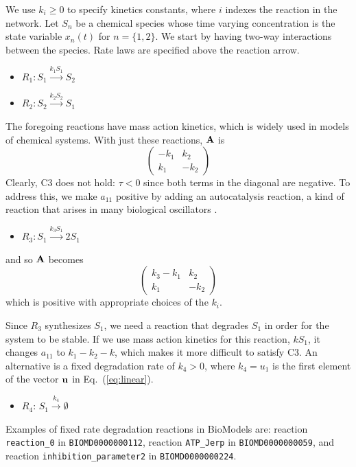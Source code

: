 \documentclass{bmcart}
\newcommand{\eqn}[1]{Eq.~(\ref{#1})}
\begin{document}
We use $k_i \geq 0$ to specify kinetics constants, where $i$ indexes the reaction in the network. Let $S_n$ be a chemical species whose time varying concentration is the state variable $x_n(t)$ for $n=\{1,2\}.$ We start by having two-way interactions between the species. Rate laws are specified above the reaction arrow.
\begin{itemize}
    \item $R_1: S_1 \xrightarrow{k_1 S_1} S_2$
    \item $R_2: S_2 \xrightarrow{k_2 S_2} S_1$
\end{itemize}
The foregoing reactions have mass action kinetics, which is widely used in models of chemical systems.
With just these reactions, ${\bf A}$ is
$$\left( \begin{matrix}
     - k_1 & k_2  \\
     k_1 & -k_2 
\end{matrix} \right)$$
Clearly, C3 does not hold: $\tau < 0$ since both terms in the diagonal are negative. To address this, we make $a_{11}$ positive by adding an autocatalysis reaction, a kind of reaction that
arises in many biological oscillators \cite{novichkov_autocatalytic_2021}.
\begin{itemize}
    \item $R_3: S_1 \xrightarrow{k_3 S_1} 2 S_1$
\end{itemize}
and so ${\bf A}$ becomes
$$\left( \begin{matrix}
     k_3 - k_1 & k_2  \\
     k_1 & -k_2
\end{matrix} \right)$$
which is positive with appropriate choices of the $k_i$.

Since $R_3$ synthesizes $S_1$, we need a reaction that degrades $S_1$ in order for the system to be stable. If we use mass action kinetics for this reaction, $kS_1$, it changes $a_{11}$ to $k_1-k_2-k$, which makes it more difficult to satisfy C3. An alternative is a fixed degradation rate of $k_4 > 0$, where $k_4 = u_1$ is the first element of the vector ${\bf u}$ in \eqn{eq:linear}.
\begin{itemize}
    \item $R_4$: $S_1\xrightarrow{k_4}\emptyset$
\end{itemize}
Examples of fixed rate degradation reactions in BioModels are: reaction {\tt reaction\_0} in {\tt BIOMD0000000112}, reaction
{\tt ATP\_Jerp} in {\tt BIOMD0000000059},
and reaction
\linebreak
{\tt inhibition\_parameter2} in {\tt BIOMD0000000224}.
\end{document}
